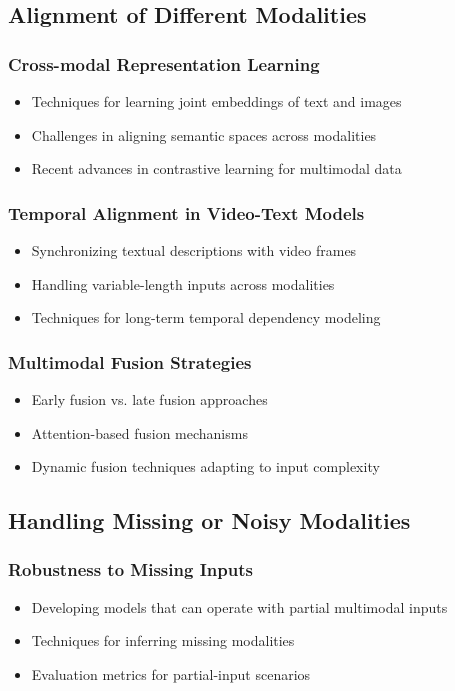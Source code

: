 \subsection{Alignment of Different Modalities}
\subsubsection{Cross-modal Representation Learning}
\begin{itemize}
    \item Techniques for learning joint embeddings of text and images
    \item Challenges in aligning semantic spaces across modalities
    \item Recent advances in contrastive learning for multimodal data
\end{itemize}

\subsubsection{Temporal Alignment in Video-Text Models}
\begin{itemize}
    \item Synchronizing textual descriptions with video frames
    \item Handling variable-length inputs across modalities
    \item Techniques for long-term temporal dependency modeling
\end{itemize}

\subsubsection{Multimodal Fusion Strategies}
\begin{itemize}
    \item Early fusion vs. late fusion approaches
    \item Attention-based fusion mechanisms
    \item Dynamic fusion techniques adapting to input complexity
\end{itemize}

\subsection{Handling Missing or Noisy Modalities}
\subsubsection{Robustness to Missing Inputs}
\begin{itemize}
    \item Developing models that can operate with partial multimodal inputs
    \item Techniques for inferring missing modalities
    \item Evaluation metrics for partial-input scenarios
\end{itemize}


